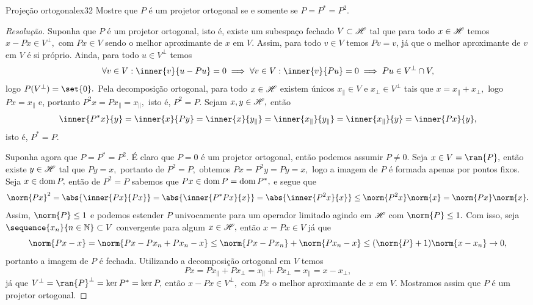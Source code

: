 \begin{exercício}{Projeção ortogonal}{ex32}
    Mostre que \(P\) é um projetor ortogonal se e somente se \(P = P^* = P^2.\)
\end{exercício}
\begin{proof}[Resolução]
  Suponha que \(P\) é um projetor ortogonal, isto é, existe um subespaço fechado \(V \subset \mathscr{H}\) tal que para todo \(x \in \mathscr{H}\) temos \(x - Px \in V^\perp,\) com \(Px \in V\) sendo o melhor aproximante de \(x\) em \(V.\) Assim, para todo \(v \in V\) temos \(Pv = v\), já que o melhor aproximante de \(v\)  em \(V\) é si próprio. Ainda, para todo \(u \in V^\perp\) temos
  \begin{equation*}
    \forall v \in V : \inner{v}{u - Pu} = 0 \implies \forall v \in V : \inner{v}{Pu} = 0 \implies Pu \in V^\perp \cap V,
  \end{equation*}
  logo \(P (V^{\perp}) = \set{0}.\) Pela decomposição ortogonal, para todo \(x \in \mathscr{H}\) existem únicos \(x_\parallel \in V\) e \(x_\perp \in V^\perp\) tais que \(x = x_\parallel + x_\perp,\) logo \(Px = x_\parallel\) e, portanto \(P^2x = Px_\parallel = x_\parallel,\) isto é, \(P^2 = P.\) Sejam \(x, y \in \mathscr{H},\) então
  \begin{equation*}
    \inner{P^*x}{y} = \inner{x}{Py} = \inner{x}{y_\parallel} = \inner{x_\parallel}{y_\parallel} = \inner{x_{\parallel}}{y} = \inner{Px}{y},
  \end{equation*}
  isto é, \(P^* = P.\)

  Suponha agora que \(P = P^* = P^2.\) É claro que \(P = 0\) é um projetor ortogonal, então podemos assumir \(P \neq 0.\) Seja \(x \in V = \ran{P},\) então existe \(y \in \mathscr{H}\) tal que \(Py = x,\) portanto de \(P^2 = P,\) obtemos \(Px = P^2y = Py = x,\) logo a imagem de \(P\) é formada apenas por pontos fixos. Seja \(x \in \operatorname{dom}{P},\) então de \(P^2 = P\) sabemos que \(Px \in \operatorname{dom}{P} = \operatorname{dom}{P^*},\) e segue que
  \begin{equation*}
    \norm{Px}^2 = \abs{\inner{Px}{Px}} = \abs{\inner{P^*Px}{x}} = \abs{\inner{P^2x}{x}} \leq \norm{P^2x}\norm{x} = \norm{Px}\norm{x}.
  \end{equation*}
  Assim, \(\norm{P} \leq 1\) e podemos estender \(P\) univocamente para um operador limitado agindo em \(\mathscr{H}\) com \(\norm{P} \leq 1.\) Com isso, seja \(\sequence{x_n}{n\in\mathbb{N}} \subset V\) convergente para algum \(x \in \mathscr{H},\) então \(x = Px \in V\) já que
  \begin{equation*}
    \norm{Px - x} = \norm{Px - Px_n + Px_n - x} \leq \norm{Px - Px_n} + \norm{Px_n - x} \leq (\norm{P} + 1) \norm{x - x_n} \to 0,
  \end{equation*}
  portanto a imagem de \(P\) é fechada. Utilizando a decomposição ortogonal em \(V\) temos
  \begin{equation*}
      Px = Px_\parallel + Px_\perp = x_\parallel + Px_\perp = x_\parallel = x - x_\perp,
  \end{equation*}
  já que \(V^\perp = \ran{P}^\perp = \ker{P^*} = \ker{P},\) então \(x - Px \in V^\perp,\) com \(Px\) o melhor aproximante de \(x\) em \(V.\) Mostramos assim que \(P\) é um projetor ortogonal.
\end{proof}
